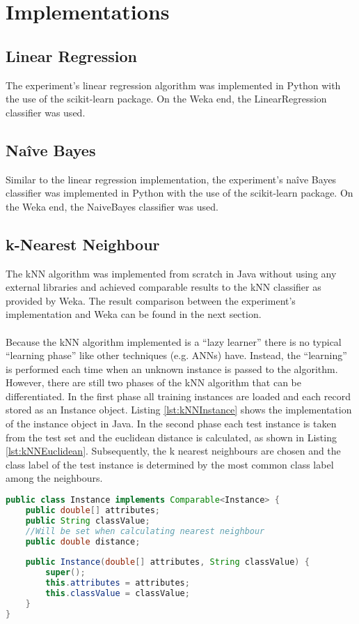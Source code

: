 \section{Implementations}
\subsection{Linear Regression}
The experiment's linear regression algorithm was implemented in Python with the use of the scikit-learn package. On the Weka end, the LinearRegression classifier was used.

\subsection{Naîve Bayes}
Similar to the linear regression implementation, the experiment's naîve Bayes classifier was implemented in Python with the use of the scikit-learn package. On the Weka end, the NaiveBayes classifier was used.

\subsection{k-Nearest Neighbour}
The kNN algorithm was implemented from scratch in Java without using any external libraries and achieved comparable results to the kNN classifier as provided by Weka. The result comparison between the experiment's implementation and Weka can be found in the next section.
\\
\\Because the kNN algorithm implemented is a ``lazy learner'' there is no typical ``learning phase'' like other techniques (e.g. ANNs) have. Instead, the ``learning'' is performed each time when an unknown instance is passed to the algorithm. However, there are still two phases of the kNN algorithm that can be differentiated.
In the first phase all training instances are loaded and each record stored as an Instance object. Listing \ref{lst:kNNInstance} shows the implementation of the instance object in Java. In the second phase each test instance is taken from the test set and the euclidean distance is calculated, as shown in Listing \ref{lst:kNNEuclidean}. Subsequently, the k nearest neighbours are chosen and the class label of the test instance is determined by the most common class label among the neighbours.

\begin{lstlisting}[language=Java, caption={POJO to store instances}, label=lst:kNNInstance]
public class Instance implements Comparable<Instance> {
	public double[] attributes;
	public String classValue;
	//Will be set when calculating nearest neighbour
	public double distance;
	
	public Instance(double[] attributes, String classValue) {
		super();
		this.attributes = attributes;
		this.classValue = classValue;
	}	
}
\end{lstlisting}


